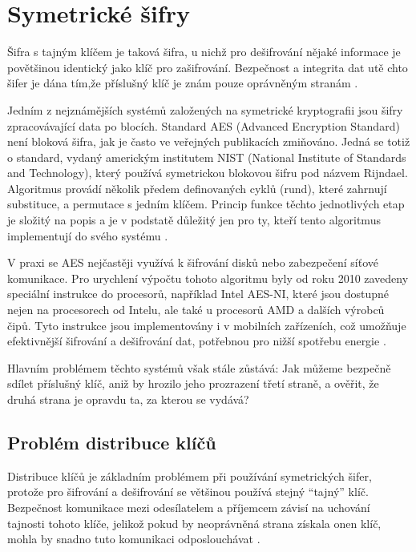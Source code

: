 \section{Symetrické šifry}
Šifra s tajným klíčem je taková šifra, u nichž pro dešifrování nějaké informace je povětšinou identický jako klíč pro zašifrování. Bezpečnost a integrita dat utě chto šifer je dána tím,že příslušný klíč je znám pouze oprávněným stranám \parencite{tesar2021}.

Jedním z nejznámějších systémů založených na symetrické kryptografii jsou šifry zpracovávající data po blocích. Standard AES (Advanced Encryption Standard) není bloková šifra, jak je často ve veřejných publikacích zmiňováno. Jedná se totiž o standard, vydaný americkým institutem NIST (National Institute of Standards and Technology), který používá symetrickou blokovou šifru pod názvem Rijndael. Algoritmus provádí několik předem definovaných cyklů (rund), které zahrnují substituce, a permutace s jedním klíčem. Princip funkce těchto jednotlivých etap je složitý na popis a je v podstatě důležitý jen pro ty, kteří tento algoritmus implementují do svého systému \parencite {nist2023}.

V praxi se AES nejčastěji využívá k šifrování disků nebo zabezpečení síťové komunikace. Pro urychlení výpočtu tohoto algoritmu byly od roku 2010 zavedeny speciální instrukce do procesorů, například Intel \textregistered{} AES-NI, které jsou dostupné nejen na procesorech od Intelu, ale také u procesorů AMD a dalších výrobců čipů. Tyto instrukce jsou implementovány i v mobilních zařízeních, což umožňuje efektivnější šifrování a dešifrování dat, potřebnou pro nižší spotřebu energie \textcite{abdallah2020}.

Hlavním problémem těchto systémů však stále zůstává: Jak můžeme bezpečně sdílet příslušný klíč, aniž by hrozilo jeho prozrazení třetí straně, a ověřit, že druhá strana je opravdu ta, za kterou se vydává?

\subsection{Problém distribuce klíčů}
\label{sec:distribuce-klicu}
Distribuce klíčů je základním problémem při používání symetrických šifer, protože pro šifrování a dešifrování se většinou používá stejný \enquote{tajný} klíč. Bezpečnost komunikace mezi odesílatelem a příjemcem závisí na uchování tajnosti tohoto klíče, jelikož pokud by neoprávněná strana získala onen klíč, mohla by snadno tuto komunikaci odposlouchávat \parencite{tesar2021}.

